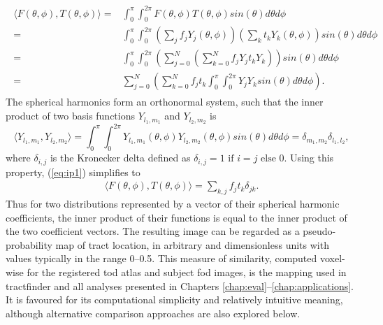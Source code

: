 \documentclass[12pt,phd,a4paper,twoside]{ucl_thesis}
\begin{document}
\begin{align}
  \begin{split}
    \langle F(\theta, \phi), T(\theta, \phi) \rangle
    =& \int_0^{\pi} \int_0^{2\pi} F(\theta, \phi) T(\theta, \phi) sin(\theta) d\theta d\phi \\
    = & \int_0^{\pi} \int_0^{2\pi} (\sum_j f_jY_j(\theta, \phi)) (\sum_k t_kY_k(\theta, \phi)) sin(\theta) d\theta d\phi \\
    = & \int_0^{\pi} \int_0^{2\pi}  (\sum_{j=0}^N (\sum_{k=0}^N f_jY_j t_kY_k )) sin(\theta) d\theta d\phi \\
    = & \sum_{j=0}^N (\sum_{k=0}^N f_j t_k \int_0^{\pi} \int_0^{2\pi}  Y_j Y_k sin(\theta) d\theta d\phi ).
  \end{split}\label{eq:ip1}
\end{align}
The spherical harmonics form an orthonormal system, such that the inner product of two basis functions $Y_{l_1,m_1}$ and $Y_{l_2,m_2}$ is
\begin{equation}
  \langle Y_{l_1,m_1}, Y_{l_2,m_2} \rangle
    = \int_0^{\pi} \int_0^{2\pi} Y_{l_1,m_1}(\theta, \phi) Y_{l_2,m_2}(\theta, \phi) sin(\theta) d\theta d\phi
    = \delta_{m_1, m_2} \delta_{l_1, l_2},
\end{equation}
where $\delta_{i,j}$ is the Kronecker delta defined as $\delta_{i,j} = 1 \text{ if } i = j \text{ else } 0$.
Using this property, (\ref{eq:ip1}) simplifies to
\begin{align}
  \langle F(\theta, \phi), T(\theta, \phi) \rangle = \sum_{k,j} f_j t_k \delta_{jk}.
\end{align}\label{eq:ip2}
Thus for two distributions represented by a vector of their spherical harmonic coefficients, the inner product of their functions is equal to the inner product of the two coefficient vectors.
The resulting image can be regarded as a pseudo-probability map of tract location, in arbitrary and dimensionless units with values typically in the range 0--0.5.
This measure of similarity, computed voxel-wise for the registered \gls{tod} atlas and subject \gls{fod} images, is the mapping used in tractfinder and all analyses presented in Chapters \ref{chap:eval}--\ref{chap:applications}.
It is favoured for its computational simplicity and relatively intuitive meaning, although alternative comparison approaches are also explored below.
\end{document}
